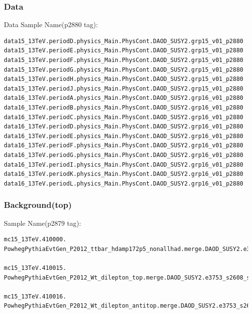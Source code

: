 \documentclass[mathserif,serif]{beamer}
\begin{document}
\begin{frame}[fragile]
\frametitle{Data}
\small
Data Sample Name(p2880 tag):
\tiny
\begin{verbatim}
data15_13TeV.periodD.physics_Main.PhysCont.DAOD_SUSY2.grp15_v01_p2880
data15_13TeV.periodE.physics_Main.PhysCont.DAOD_SUSY2.grp15_v01_p2880
data15_13TeV.periodF.physics_Main.PhysCont.DAOD_SUSY2.grp15_v01_p2880
data15_13TeV.periodG.physics_Main.PhysCont.DAOD_SUSY2.grp15_v01_p2880
data15_13TeV.periodH.physics_Main.PhysCont.DAOD_SUSY2.grp15_v01_p2880
data15_13TeV.periodJ.physics_Main.PhysCont.DAOD_SUSY2.grp15_v01_p2880
data16_13TeV.periodA.physics_Main.PhysCont.DAOD_SUSY2.grp16_v01_p2880
data16_13TeV.periodB.physics_Main.PhysCont.DAOD_SUSY2.grp16_v01_p2880
data16_13TeV.periodC.physics_Main.PhysCont.DAOD_SUSY2.grp16_v01_p2880
data16_13TeV.periodD.physics_Main.PhysCont.DAOD_SUSY2.grp16_v01_p2880
data16_13TeV.periodE.physics_Main.PhysCont.DAOD_SUSY2.grp16_v01_p2880
data16_13TeV.periodF.physics_Main.PhysCont.DAOD_SUSY2.grp16_v01_p2880
data16_13TeV.periodG.physics_Main.PhysCont.DAOD_SUSY2.grp16_v01_p2880
data16_13TeV.periodI.physics_Main.PhysCont.DAOD_SUSY2.grp16_v01_p2880
data16_13TeV.periodK.physics_Main.PhysCont.DAOD_SUSY2.grp16_v01_p2880
data16_13TeV.periodL.physics_Main.PhysCont.DAOD_SUSY2.grp16_v01_p2880
\end{verbatim}
\end{frame}

\begin{frame}[fragile]
\frametitle{Background(top)}
\small
Sample Name(p2879 tag):
\tiny
\begin{verbatim}
mc15_13TeV.410000.
PowhegPythiaEvtGen_P2012_ttbar_hdamp172p5_nonallhad.merge.DAOD_SUSY2.e3698_s2608_s2183_r7725_r7676_p2879

mc15_13TeV.410015.
PowhegPythiaEvtGen_P2012_Wt_dilepton_top.merge.DAOD_SUSY2.e3753_s2608_s2183_r7725_r7676_p2879

mc15_13TeV.410016.
PowhegPythiaEvtGen_P2012_Wt_dilepton_antitop.merge.DAOD_SUSY2.e3753_s2608_s2183_r7725_r7676_p2879
\end{verbatim}
\end{frame}
\end{document}
